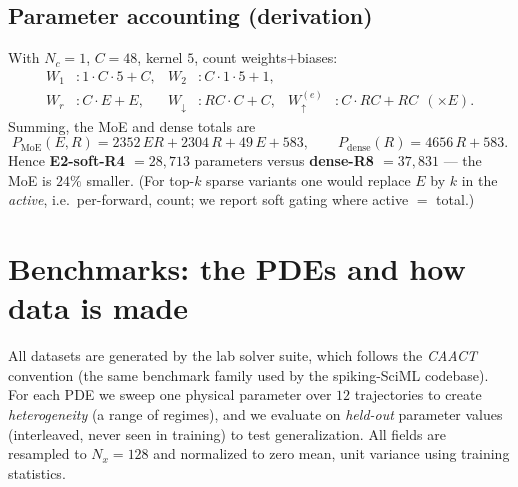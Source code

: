 \documentclass[11pt]{article}
\begin{document}
\subsection{Parameter accounting (derivation)}
With $N_c{=}1$, $C{=}48$, kernel $5$, count weights$+$biases:
\begin{align*}
W_1 &: 1\cdot C\cdot5 + C, & W_2 &: C\cdot1\cdot5 + 1, \\
W_r &: C\cdot E + E, & W_\downarrow &: RC\cdot C + C, & W_\uparrow^{(e)} &: C\cdot RC + RC \ \ (\times E).
\end{align*}
Summing, the MoE and dense totals are
\begin{equation}
P_{\mathrm{MoE}}(E,R) = 2352\,ER + 2304\,R + 49\,E + 583,\qquad
P_{\mathrm{dense}}(R) = 4656\,R + 583.
\end{equation}
Hence \textbf{E2-soft-R4 $=28{,}713$} parameters versus \textbf{dense-R8 $=37{,}831$} --- the MoE is
$24\%$ smaller. (For top-$k$ sparse variants one would replace $E$ by $k$ in the \emph{active}, i.e.\
per-forward, count; we report soft gating where active $=$ total.)

\section{Benchmarks: the PDEs and how data is made}\label{sec:bench}
All datasets are generated by the lab solver suite, which follows the \emph{CAACT} convention (the
same benchmark family used by the spiking-SciML codebase). For each PDE we sweep one physical
parameter over $12$ trajectories to create \emph{heterogeneity} (a range of regimes), and we
evaluate on \emph{held-out} parameter values (interleaved, never seen in training) to test
generalization. All fields are resampled to $N_x{=}128$ and normalized to zero mean, unit variance
using training statistics.
\end{document}
